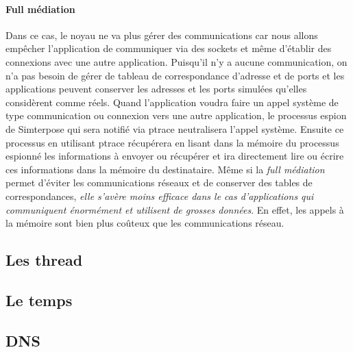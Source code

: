 \paragraph{Full médiation} 
Dans ce cas, le noyau ne va plus gérer des communications car nous allons
empêcher l'application de communiquer via des sockets et même d'établir des
connexions avec une autre application.  Puisqu'il n'y a aucune communication, on
n'a pas besoin de gérer de tableau de correspondance d'adresse et de ports et
les applications peuvent conserver les adresses et les ports simulées qu'elles
considèrent comme réels. Quand l'application voudra faire un appel système de
type communication ou connexion vers une autre application, le processus espion
de Simterpose qui sera notifié via ptrace neutralisera l'appel système. Ensuite
ce processus en utilisant ptrace récupérera en lisant dans la mémoire du
processus espionné les informations à envoyer ou récupérer et ira directement
lire ou écrire ces informations dans la mémoire du destinataire.  Même si la
\textit{full médiation} permet d'éviter les communications réseaux et de
conserver des tables de correspondances, \textit{elle s'avère moins efficace
  dans le cas d'applications qui communiquent énormément et utilisent de grosses
  données}. En effet, les appels à la mémoire sont bien plus coûteux que les
communications réseau.

\subsection{Les thread}

\subsection{Le temps}

\subsection{DNS}
